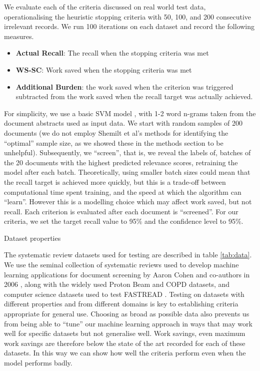 \documentclass{bmcart}
\begin{document}
	We evaluate each of the criteria discussed on real world test data, operationalising the heuristic stopping criteria with 50, 100, and 200 consecutive irrelevant records. We run 100 iterations on each dataset and record the following measures.
	\begin{itemize}
		\item \textbf{Actual Recall}: The recall when the stopping criteria was met
		\item \textbf{WS-SC}: Work saved when the stopping criteria was met
		\item \textbf{Additional Burden}: the work saved when the criterion was triggered subtracted from the work saved when the recall target was actually achieved.
		
	\end{itemize}
	For simplicity, we use a basic SVM model \cite{Cortes95, Pedregosa2011}, with 1-2 word n-grams taken from the document abstracts used as input data. We start with random samples of 200 documents (we do not employ Shemilt et al's methods for identifying the ``optimal'' sample size, as we showed these in the methods section to be unhelpful). Subsequently, we ``screen'', that is, we reveal the labels of, batches of the 20 documents with the highest predicted relevance scores, retraining the model after each batch. Theoretically, using smaller batch sizes could mean that the recall target is achieved more quickly, but this is a trade-off between computational time spent training, and the speed at which the algorithm can ``learn''. However this is a modelling choice which may affect work saved, but not recall. Each criterion is evaluated after each document is ``screened''.
	For our criteria, we set the target recall value to 95\% and the confidence level to 95\%.
	
	
	\begin{table}
		
		\caption{Dataset properties}
		\label{tab:data}
	\end{table}
	
	The systematic review datasets used for testing are described in table \ref{tab:data}. We use the seminal collection of systematic reviews used to develop machine learning applications for document screening by Aaron Cohen and co-authors in 2006 \cite{Cohen2006}, along with the widely used Proton Beam \cite{Terasawa2009} and COPD \cite{Castaldi2009} datasets, and computer science datasets used to test FASTREAD \cite{Yu2019}. Testing on datasets with different properties and from different domains is key to establishing criteria appropriate for general use. Choosing as broad as possible data also prevents us from being able to ``tune'' our machine learning approach in ways that may work well for specific datasets but not generalise well. Work savings, even maximum work savings are therefore below the state of the art recorded for each of these datasets. In this way we can show how well the criteria perform even when the model performs badly.
	
\end{document}
